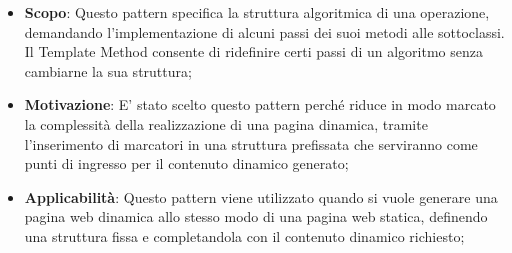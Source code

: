 		\begin{itemize}
			\item \textbf{Scopo}: Questo pattern specifica la struttura algoritmica di una operazione, demandando l'implementazione di alcuni passi dei suoi metodi alle sottoclassi. Il Template Method consente di ridefinire certi passi di un algoritmo senza cambiarne la sua struttura;
			
			\item \textbf{Motivazione}: E' stato scelto questo pattern perché riduce in modo marcato la complessità della realizzazione di una pagina dinamica, tramite l'inserimento di marcatori in una struttura prefissata che serviranno come punti di ingresso per il contenuto dinamico generato;
			
			\item \textbf{Applicabilità}: Questo pattern viene utilizzato quando si vuole generare una pagina web dinamica allo stesso modo di una pagina web statica, definendo una struttura fissa e completandola con il contenuto dinamico richiesto;
			
		\end{itemize}



